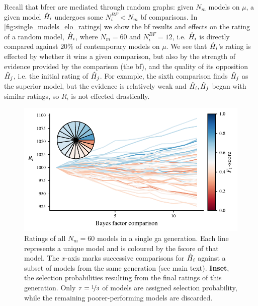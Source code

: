 {Recall that \gls{bfeer} are mediated through random graphs: 
    given $N_m$ models on $\mu$, a given model $\hat{H}_i$ undergoes some 
    $N_i^{BF} < N_m$ \gls{bf} comparisons. 
In \cref{fig:single_models_elo_ratings} we show the \gls{bf} results 
    and effects on the rating of a random model, $\hat{H}_i$, where $N_m=60$ and $N_i^{BF}=12$,
    i.e. $\hat{H}_i$ is directly compared against $20\%$ of contemporary models on $\mu$. 
We see that $\hat{H}_i$'s rating is effected by whether it wins a given comparison, 
    but also by the strength of evidence provided by the comparison (the \gls{bf}), 
    and the quality of its opposition $\hat{H}_j$, i.e. the initial rating of $\hat{H}_j$.
For example, the sixth comparison finds $\hat{H}_j$ as the superior model, 
    but the evidence is relatively weak and $\hat{H}_i, \hat{H}_j$ began with similar ratings, 
    so $R_i$ is not effected drastically. 


\par 
\begin{figure}
    \begin{center}
        \includegraphics{theoretical_study/figures/single_generation_all_ratings.pdf}
    \end{center}
    \caption[Ratings of all models in a single genetic algorithm generation]{
        Ratings of all $N_m=60$ models in a single \acrlong{ga} generation.
        Each line represents a unique model and is coloured by the \gls{fscore} of that model. 
        The $x$-axis marks successive comparisons for $\hat{H}_i$ against a subset of models from the same generation (see main text).
        \textbf{Inset}, the selection probabilities resulting from the final ratings of this generation. 
        Only $\tau=\nicefrac{1}{3}$ of models are assigned selection probability, 
            while the remaining poorer-performing models are discarded. 
        \figtableref
    }
    \label{fig:single_generation_all_ratings}
\end{figure}

}
